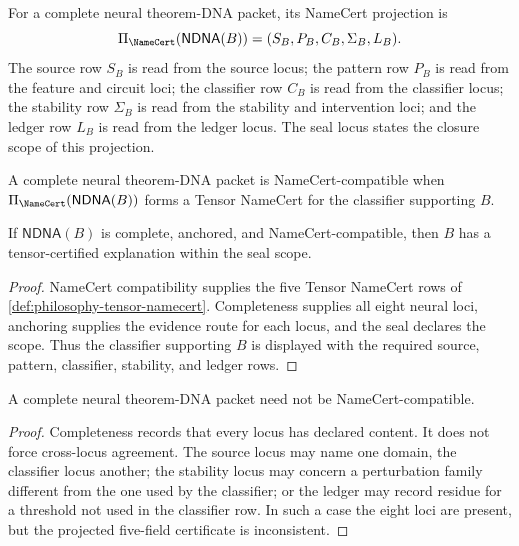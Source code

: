 \begin{definition}
\label{def:philosophy-ndna-namecert-projection}
For a complete neural theorem-DNA packet, its NameCert projection is
$$
\Pi_{\NameCert}(\mathsf{NDNA}(B))
=
(S_B,P_B,C_B,\Sigma_B,L_B).
$$
The source row $S_B$ is read from the source locus; the pattern row
$P_B$ is read from the feature and circuit loci; the classifier row
$C_B$ is read from the classifier locus; the stability row $\Sigma_B$
is read from the stability and intervention loci; and the ledger row
$L_B$ is read from the ledger locus. The seal locus states the closure
scope of this projection.
\end{definition}

\begin{definition}
\label{def:philosophy-namecert-compatible-ndna}
A complete neural theorem-DNA packet is NameCert-compatible when
$\Pi_{\NameCert}(\mathsf{NDNA}(B))$ forms a Tensor NameCert for the
classifier supporting $B$.
\end{definition}

\begin{theorem}
\label{thm:philosophy-namecert-compatible-ndna-yields-tensor-certification}
If $\mathsf{NDNA}(B)$ is complete, anchored, and
NameCert-compatible, then $B$ has a tensor-certified explanation within
the seal scope.
\end{theorem}
\begin{proof}
NameCert compatibility supplies the five Tensor NameCert rows of
\autoref{def:philosophy-tensor-namecert}. Completeness supplies all
eight neural loci, anchoring supplies the evidence route for each locus,
and the seal declares the scope. Thus the classifier supporting $B$ is
displayed with the required source, pattern, classifier, stability, and
ledger rows.
\end{proof}

\begin{theorem}
\label{thm:philosophy-complete-ndna-not-necessarily-namecert-compatible}
A complete neural theorem-DNA packet need not be NameCert-compatible.
\end{theorem}
\begin{proof}
Completeness records that every locus has declared content. It does not
force cross-locus agreement. The source locus may name one domain, the
classifier locus another; the stability locus may concern a perturbation
family different from the one used by the classifier; or the ledger may
record residue for a threshold not used in the classifier row. In such a
case the eight loci are present, but the projected five-field certificate
is inconsistent.
\end{proof}

